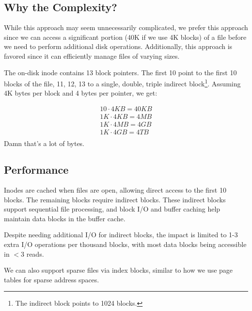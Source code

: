 \documentclass{report}
\newcommand{\exampleBegin}[1]{\begin{tcolorbox}[colback=blue!5!white,colframe=black!75!blue,title={Example:
      #1}]}
\newcommand{\exampleEnd}{\end{tcolorbox}}
\begin{document}
\subsection{Why the Complexity?}
While this approach may seem unnecessarily complicated, we prefer this approach since we can access
a significant portion (40K if we use 4K blocks) of a file before we need to perform additional disk
operations. Additionally, this approach is favored since it can efficiently manage files of varying
sizes.

\exampleBegin{File Sizes Round 2}
The on-disk inode contains 13 block pointers. The first 10 point to the first 10 blocks of the file,
11, 12, 13 to a single, double, triple indirect block\footnote{The indirect block points to 1024
  blocks.}. Assuming 4K bytes per block and 4 bytes per pointer, we get:

\begin{align*}
  10 \cdot 4KB = 40KB \\
  1K \cdot 4KB = 4MB \\
  1K \cdot 4MB = 4GB \\
  1K \cdot 4GB = 4TB \\
\end{align*}
Damn that's a lot of bytes.
\exampleEnd

\subsection{Performance}
Inodes are cached when files are open, allowing direct access to the first 10 blocks. The remaining
blocks require indirect blocks. These indirect blocks support sequential file processing, and block
I/O and buffer caching help maintain data blocks in the buffer cache.

Despite needing additional I/O for indirect blocks, the impact is limited to 1-3 extra I/O
operations per thousand blocks, with most data blocks being accessible in $< 3$ reads.

We can also support sparse files via index blocks, similar to how we use page tables for sparse
address spaces.
\end{document}
